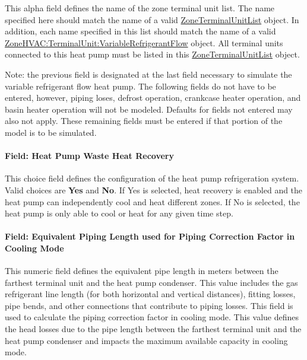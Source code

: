 This alpha field defines the name of the zone terminal unit list. The name specified here should match the name of a valid \hyperref[zoneterminalunitlist]{ZoneTerminalUnitList} object. In addition, each name specified in this list should match the name of a valid \hyperref[zonehvacterminalunitvariablerefrigerantflow]{ZoneHVAC:TerminalUnit:VariableRefrigerantFlow} object. All terminal units connected to this heat pump must be listed in this \hyperref[zoneterminalunitlist]{ZoneTerminalUnitList} object.

Note: the previous field is designated at the last field necessary to simulate the variable refrigerant flow heat pump. The following fields do not have to be entered, however, piping loses, defrost operation, crankcase heater operation, and basin heater operation will not be modeled. Defaults for fields not entered may also not apply. These remaining fields must be entered if that portion of the model is to be simulated.

\paragraph{Field: Heat Pump Waste Heat Recovery}\label{field-heat-pump-waste-heat-recovery-000}

This choice field defines the configuration of the heat pump refrigeration system. Valid choices are \textbf{Yes} and \textbf{No}. If Yes is selected, heat recovery is enabled and the heat pump can independently cool and heat different zones. If No is selected, the heat pump is only able to cool or heat for any given time step.

\paragraph{Field: Equivalent Piping Length used for Piping Correction Factor in Cooling Mode}\label{field-equivalent-piping-length-used-for-piping-correction-factor-in-cooling-mode-000}

This numeric field defines the equivalent pipe length in meters between the farthest terminal unit and the heat pump condenser. This value includes the gas refrigerant line length (for both horizontal and vertical distances), fitting losses, pipe bends, and other connections that contribute to piping losses. This field is used to calculate the piping correction factor in cooling mode. This value defines the head losses due to the pipe length between the farthest terminal unit and the heat pump condenser and impacts the maximum available capacity in cooling mode.

